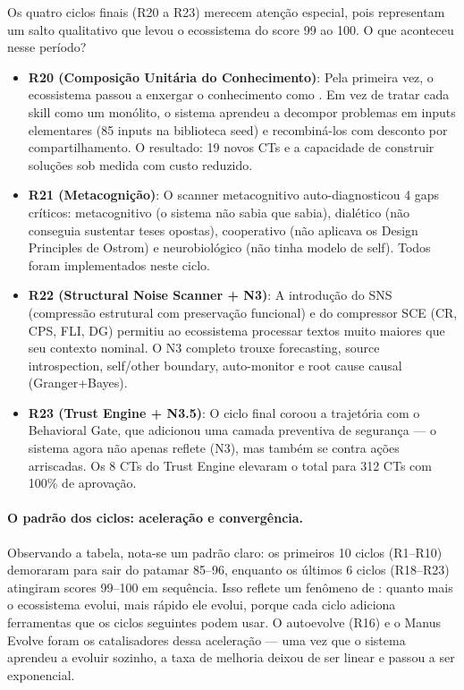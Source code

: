 Os quatro ciclos finais (R20 a R23) merecem atenção especial, pois
representam um salto qualitativo que levou o ecossistema do score 99 ao
100. O que aconteceu nesse período?

\begin{itemize}
  \item \textbf{R20 (Composição Unitária do Conhecimento)}: Pela primeira
        vez, o ecossistema passou a enxergar o conhecimento como
        . Em vez de tratar cada skill como
        um monólito, o sistema aprendeu a decompor problemas em inputs
        elementares (85 inputs na biblioteca seed) e recombiná-los com
        desconto por compartilhamento. O resultado: 19 novos CTs e a
        capacidade de construir soluções sob medida com custo reduzido.
  \item \textbf{R21 (Metacognição)}: O scanner metacognitivo
        auto-diagnosticou 4 gaps críticos: metacognitivo (o sistema não
        sabia que sabia), dialético (não conseguia sustentar teses
        opostas), cooperativo (não aplicava os Design Principles de
        Ostrom) e neurobiológico (não tinha modelo de self). Todos foram
        implementados neste ciclo.
  \item \textbf{R22 (Structural Noise Scanner + N3)}: A introdução do
        SNS (compressão estrutural com preservação funcional) e do
        compressor SCE (CR, CPS, FLI, DG) permitiu ao ecossistema
        processar textos muito maiores que seu contexto nominal. O N3
        completo trouxe forecasting, source introspection, self/other
        boundary, auto-monitor e root cause causal (Granger+Bayes).
  \item \textbf{R23 (Trust Engine + N3.5)}: O ciclo final coroou a
        trajetória com o Behavioral Gate, que adicionou uma camada
        preventiva de segurança --- o sistema agora não apenas reflete
        (N3), mas também se  contra ações
        arriscadas. Os 8 CTs do Trust Engine elevaram o total para
        312 CTs com 100\% de aprovação.
\end{itemize}

\paragraph*{O padrão dos ciclos: aceleração e convergência.} Observando a
tabela, nota-se um padrão claro: os primeiros 10 ciclos (R1--R10)
demoraram para sair do patamar 85--96, enquanto os últimos 6 ciclos
(R18--R23) atingiram scores 99--100 em sequência. Isso reflete um
fenômeno de : quanto mais o ecossistema
evolui, mais rápido ele evolui, porque cada ciclo adiciona ferramentas
que os ciclos seguintes podem usar. O autoevolve (R16) e o Manus Evolve
foram os catalisadores dessa aceleração --- uma vez que o sistema
aprendeu a evoluir sozinho, a taxa de melhoria deixou de ser linear e
passou a ser exponencial.


